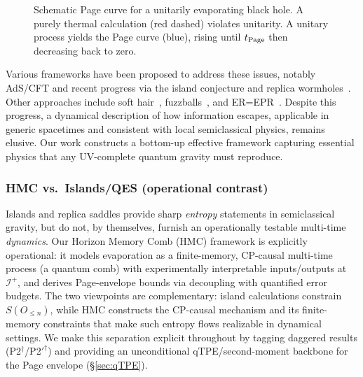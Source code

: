 \documentclass[aps,prd,preprint,onecolumn,superscriptaddress,nofootinbib,longbibliography,floatfix,11pt,showpacs,showkeys]{revtex4-2}
\theoremstyle{plain}
\theoremstyle{definition}
\theoremstyle{remark}
\begin{document}
\begin{figure}[htbp]
    \centering
    \caption{Schematic Page curve for a unitarily evaporating black hole. A purely thermal calculation (red dashed) violates unitarity. A unitary process yields the Page curve (blue), rising until $t_{\rm Page}$ then decreasing back to zero.}
    \label{fig:page_curve_intro}
\end{figure}

Various frameworks have been proposed to address these issues, notably AdS/CFT and recent progress via the island conjecture and replica wormholes~\cite{Penington:2020, Almheiri:2020, Chen:2020, Engelhardt:2015}. Other approaches include soft hair~\cite{HPS:2016}, fuzzballs~\cite{Mathur:2005b}, and ER=EPR~\cite{Maldacena:2013}. Despite this progress, a dynamical description of how information escapes, applicable in generic spacetimes and consistent with local semiclassical physics, remains elusive. Our work constructs a bottom-up effective framework capturing essential physics that any UV-complete quantum gravity must reproduce.

\subsubsection{HMC vs.\ Islands/QES (operational contrast)}
Islands and replica saddles provide sharp \emph{entropy} statements in semiclassical gravity,
but do not, by themselves, furnish an operationally testable multi-time \emph{dynamics}.
Our Horizon Memory Comb (HMC) framework is explicitly operational: it models evaporation
as a finite-memory, CP-causal multi-time process (a quantum comb) with experimentally
interpretable inputs/outputs at $\mathcal{I}^+$, and derives Page-envelope bounds via
decoupling with quantified error budgets. The two viewpoints are complementary: island
calculations constrain $S(O_{\le n})$, while HMC constructs the CP-causal mechanism and
its finite-memory constraints that make such entropy flows realizable in dynamical settings.
We make this separation explicit throughout by tagging daggered results (P2$^\dagger$/P2$'^{\dagger}$)
and providing an unconditional qTPE/second-moment backbone for the Page envelope
(\S\ref{sec:qTPE}).
\end{document}
